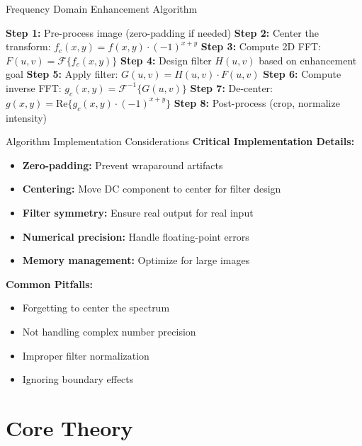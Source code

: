 \documentclass[aspectratio=169,10pt]{beamer}
\begin{document}
\begin{frame}{Frequency Domain Enhancement Algorithm}
\begin{algorithm}[H]
\BlankLine
\textbf{Step 1:} Pre-process image (zero-padding if needed)\;
\textbf{Step 2:} Center the transform: $f_c(x,y) = f(x,y) \cdot (-1)^{x+y}$\;
\textbf{Step 3:} Compute 2D FFT: $F(u,v) = \mathcal{F}\{f_c(x,y)\}$\;
\textbf{Step 4:} Design filter $H(u,v)$ based on enhancement goal\;
\textbf{Step 5:} Apply filter: $G(u,v) = H(u,v) \cdot F(u,v)$\;
\textbf{Step 6:} Compute inverse FFT: $g_c(x,y) = \mathcal{F}^{-1}\{G(u,v)\}$\;
\textbf{Step 7:} De-center: $g(x,y) = \text{Re}\{g_c(x,y) \cdot (-1)^{x+y}\}$\;
\textbf{Step 8:} Post-process (crop, normalize intensity)\;
\end{algorithm}
\end{frame}

\begin{frame}{Algorithm Implementation Considerations}
\textbf{Critical Implementation Details:}
\begin{itemize}
\item \textbf{Zero-padding:} Prevent wraparound artifacts
\item \textbf{Centering:} Move DC component to center for filter design
\item \textbf{Filter symmetry:} Ensure real output for real input
\item \textbf{Numerical precision:} Handle floating-point errors
\item \textbf{Memory management:} Optimize for large images
\end{itemize}

\vspace{0.5cm}
\textbf{Common Pitfalls:}
\begin{itemize}
\item Forgetting to center the spectrum
\item Not handling complex number precision
\item Improper filter normalization
\item Ignoring boundary effects
\end{itemize}
\end{frame}

\section{Core Theory}
\end{document}
